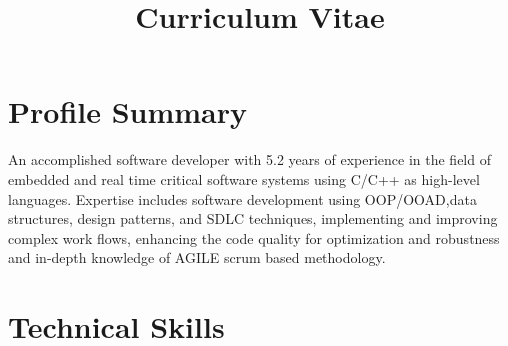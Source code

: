 \documentclass[11pt,a4paper,sans]{moderncv} %
\title{Curriculum Vitae}
\begin{document}
\makecvtitle %


\section{Profile Summary }
An accomplished software developer with 5.2 years of experience in the field of embedded and real time critical software systems using C/C++ as high-level languages.
Expertise includes software development using OOP/OOAD,data structures, design patterns, and SDLC techniques, implementing and improving complex work flows, enhancing the code quality for optimization and robustness and in-depth knowledge of  AGILE scrum based methodology.


\section{Technical Skills}

\end{document}
